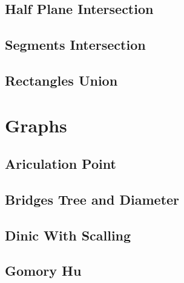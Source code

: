 \subsection{Half Plane Intersection}
\vspace{-2.2ex}
\raggedbottom
\vspace{-3.2ex}
\hrulefill
\subsection{Segments Intersection}
\vspace{-2.2ex}
\raggedbottom
\vspace{-3.2ex}
\hrulefill
\subsection{Rectangles Union}
\vspace{-2.2ex}
\raggedbottom
\vspace{-3.2ex}
\hrulefill

\section{Graphs}
\subsection{Ariculation Point}
\vspace{-2.2ex}
\raggedbottom
\vspace{-3.2ex}
\hrulefill
\subsection{Bridges Tree and Diameter}
\vspace{-2.2ex}
\raggedbottom
\vspace{-3.2ex}
\hrulefill
\subsection{Dinic With Scalling}
\vspace{-2.2ex}
\raggedbottom
\vspace{-3.2ex}
\hrulefill
\subsection{Gomory Hu}
\vspace{-2.2ex}
\raggedbottom
\vspace{-3.2ex}
\hrulefill
